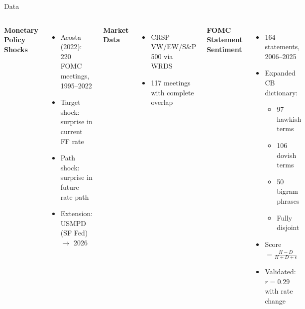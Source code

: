 \documentclass[aspectratio=169, 11pt]{beamer}
\begin{document}
\begin{frame}{Data}
\begin{columns}[T]
\textbf{Monetary Policy Shocks}
\begin{itemize}
  \item Acosta (2022): 220 FOMC meetings, 1995--2022
  \item \textcolor{accent}{Target shock}: surprise in current FF rate
  \item \textcolor{alertc}{Path shock}: surprise in future rate path
  \item Extension: USMPD (SF Fed) $\rightarrow$ 2026
\end{itemize}

\vspace{0.5em}
\textbf{Market Data}
\begin{itemize}
  \item CRSP VW/EW/S\&P 500 via WRDS
  \item 117 meetings with complete overlap
\end{itemize}

\textbf{FOMC Statement Sentiment}
\begin{itemize}
  \item 164 statements, 2006--2025
  \item Expanded CB dictionary:
    \begin{itemize}
      \item 97 hawkish terms
      \item 106 dovish terms
      \item 50 bigram phrases
      \item Fully disjoint
    \end{itemize}
  \item Score $= \frac{H - D}{H + D + \epsilon}$
  \item Validated: $r = 0.29$ with rate change
\end{itemize}
\end{columns}
\end{frame}
\end{document}
